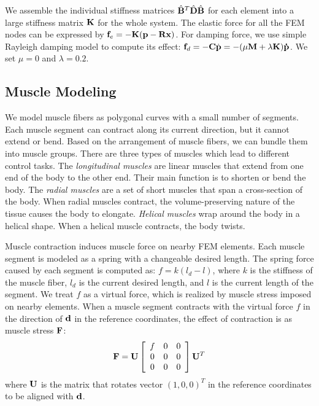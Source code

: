 We assemble the individual stiffness matrices $\hat{\mathbf{B}}^T\hat{\mathbf{D}}\hat{\mathbf{B}}$ for
each element into a large stiffness matrix $\mathbf{K}$ for the whole
system. The elastic force for all the FEM nodes can be expressed by
$\mathbf{f}_e=-\mathbf{K}(\mathbf{p}-\mathbf{R}\mathbf{x})$. For damping force, we use
simple Rayleigh damping model to compute its effect:
$\mathbf{f}_d=-\mathbf{C}\dot{\mathbf{p}}=-(\mu\mathbf{M}+\lambda\mathbf{K})\mathbf{\dot{p}}$. We
set $\mu = 0$ and $\lambda = 0.2$.

\subsection{Muscle Modeling}
We model muscle fibers as polygonal curves with a small number of
segments. Each muscle segment can contract along its current direction, but
it cannot extend or bend. Based on the arrangement of muscle fibers,
we can bundle them into muscle groups. There are three types of
muscles which lead to different control tasks. The \emph{longitudinal
muscles} are linear muscles that extend from one end of the body to the
other end. Their main function is to shorten or bend the body. The
\emph{radial muscles} are a set of short muscles that span a cross-section
of the body. When radial muscles contract, the volume-preserving
nature of the tissue causes the body to elongate. \emph{Helical
muscles} wrap around the body in a helical shape. When a helical muscle
contracts, the body twists.


Muscle contraction induces muscle force on nearby FEM elements. Each
muscle segment is modeled as a spring with a changeable desired
length. The spring force caused by each segment is computed as: $f =
k(l_d - l)$, where $k$ is the stiffness of the muscle fiber, $l_d$ is
the current desired length, and $l$ is the current length of the
segment. We treat $f$ as a virtual force, which is realized by muscle
stress imposed on nearby elements. When a muscle segment contracts
with the virtual force $f$ in the direction of $\mathbf{d}$ in the
reference coordinates, the effect of contraction is as muscle
stress $\mathbf{F}$:
\begin{equation}
\mathbf{F}=\mathbf{U}\left[\begin{array}{ccc}
f & 0 & 0\\
0 & 0 & 0\\
0 & 0 & 0
\end{array}\right]\mathbf{U}^T
\end{equation}
where $\mathbf{U}$ is the matrix that rotates vector $(1, 0, 0)^T$ in the
reference coordinates to be aligned with $\mathbf{d}$.

